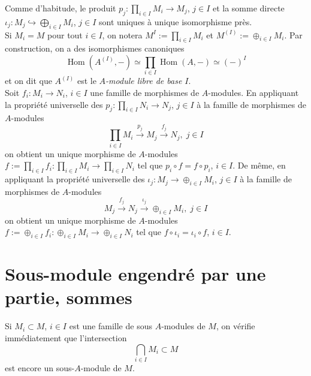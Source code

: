 \documentclass[a4paper, oneside, 12pt]{book}
\theoremstyle{theoremeStyle} %
\theoremstyle{definition} %
\DeclareMathOperator{\SHom}{Hom}
\begin{document}
  Comme d'habitude, le produit $p_{j}:\prod_{i\in I}M_{i}\rightarrow M_{j}$, $j\in I$ et la somme directe $\iota_{j}:M_{j}\hookrightarrow \bigoplus_{i\in I}M_{i}$, $j\in I$ sont uniques à unique isomorphisme près. \\




 Si $M_{i}=M$ pour tout $i\in I$, on notera $M^{I}:=\prod_{i\in I}M_{i}$ et $M^{(I)}:=\oplus_{i\in I}M_{i}$. Par construction, on a des isomorphismes   canoniques
$$ \SHom(A^{(I)},-)\simeq \prod_{i\in I}\SHom(A,-)\simeq (-)^{I}$$
et on dit que $A^{(I)}$ est le \textit{$A$-module libre de base $I$}.\\


 Soit $f_i:M_i\rightarrow N_i$, $i\in I$ une famille de morphismes de $A$-modules. En appliquant la propriété universelle des $p_j:\prod_{i\in I}N_i\rightarrow N_j$, $j\in I$ à la famille de morphismes de $A$-modules
$$ \prod_{i\in I}M_i\stackrel{p_j}{\rightarrow}M_j\stackrel{f_j}{\rightarrow} N_j,\; j\in I$$
on obtient un unique morphisme de $A$-modules $f:=\prod_{i\in I}f_i:\prod_{i\in I}M_i\rightarrow \prod_{i\in I}N_i$ tel que $p_i\circ f=f\circ p_i$, $i\in I$.   De même,  en appliquant la propriété universelle des $\iota_j:M_j\rightarrow \oplus_{i\in I}M_i$, $j\in I$ à la famille de morphismes de $A$-modules
$$ M_j\stackrel{f_j}{\rightarrow}N_j\stackrel{\iota_j}{\rightarrow} \oplus_{i\in I}M_i,\; j\in I$$
on obtient un unique morphisme de $A$-modules $f:=\oplus_{i\in I}f_i:\oplus_{i\in I}M_i\rightarrow \oplus_{i\in I}N_i$ tel que $  f\circ \iota_i=  \iota_i\circ f$, $i\in I$.

\section{Sous-module engendré par une partie, sommes}  Si $M_{i}\subset M$, $i\in I$ est une famille de sous $A$-modules de $M$, on vérifie immédiatement que l'intersection $$\bigcap_{i\in I}M_{i}\subset M$$ est encore un sous-$A$-module de $M$.\\
\end{document}
